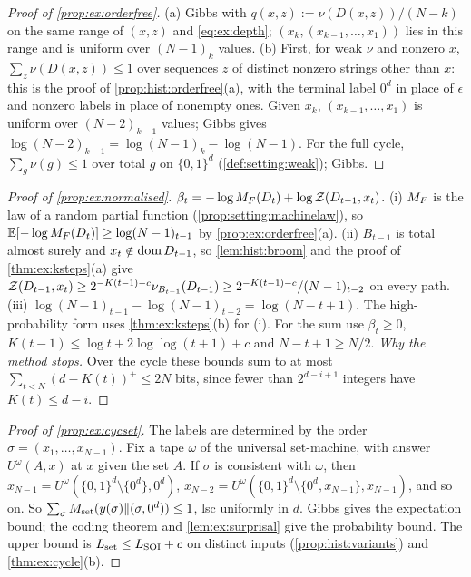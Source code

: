 \begin{proof}[Proof of \cref{prop:ex:orderfree}]
(a) Gibbs with $q(x,z):=\nu(D(x,z))/(N-k)$ on the same range of $(x,z)$ and \eqref{eq:ex:depth}; $(x_k,(x_{k-1},\dots,x_1))$ lies in this range and is uniform over $(N-1)_k$ values.
(b) First, for weak $\nu$ and nonzero $x$, $\sum_z\nu(D(x,z))\le1$ over sequences $z$ of distinct nonzero strings other than $x$: this is the proof of \cref{prop:hist:orderfree}(a), with the terminal label $0^d$ in place of $\epsilon$ and nonzero labels in place of nonempty ones. Given $x_k$, $(x_{k-1},\dots,x_1)$ is uniform over $(N-2)_{k-1}$ values; Gibbs gives $\log(N-2)_{k-1}=\log(N-1)_k-\log(N-1)$. For the full cycle, $\sum_g\nu(g)\le1$ over total $g$ on $\{0,1\}^d$ (\cref{def:setting:weak}); Gibbs.
\end{proof}

\begin{proof}[Proof of \cref{prop:ex:normalised}]
$\beta_t=-\log M_{F}(D_t)+\log\mathcal{Z}(D_{t-1},x_t)$. (i) $M_{F}$ is the law of a random partial function (\cref{prop:setting:machinelaw}), so $\mathbb{E}[-\log M_{F}(D_t)]\ge\log(N-1)_{t-1}$ by \cref{prop:ex:orderfree}(a). (ii) $B_{t-1}$ is total almost surely and $x_t\notin\operatorname{dom} D_{t-1}$, so \cref{lem:hist:broom} and the proof of \cref{thm:ex:ksteps}(a) give $\mathcal{Z}(D_{t-1},x_t)\ge2^{-K(t-1)-c}\nu_{B_{t-1}}(D_{t-1})\ge2^{-K(t-1)-c}/(N-1)_{t-2}$ on every path. (iii) $\log(N-1)_{t-1}-\log(N-1)_{t-2}=\log(N-t+1)$. The high-probability form uses \cref{thm:ex:ksteps}(b) for (i). For the sum use $\beta_t\ge0$, $K(t-1)\le\log t+2\log\log(t+1)+c$ and $N-t+1\ge N/2$.
\emph{Why the method stops.} Over the cycle these bounds sum to at most $\sum_{t<N}(d-K(t))^+\le2N$ bits, since fewer than $2^{d-i+1}$ integers have $K(t)\le d-i$.
\end{proof}

\begin{proof}[Proof of \cref{prop:ex:cycset}]
The labels are determined by the order $\sigma=(x_1,\dots,x_{N-1})$. Fix a tape $\omega$ of the universal set-machine, with answer $U^\omega(A,x)$ at $x$ given the set $A$. If $\sigma$ is consistent with $\omega$, then $x_{N-1}=U^\omega(\{0,1\}^d\setminus\{0^d\},0^d)$, $x_{N-2}=U^\omega(\{0,1\}^d\setminus\{0^d,x_{N-1}\},x_{N-1})$, and so on. So $\sum_\sigma M_{\mathrm{set}}(y(\sigma)\Vert(\sigma,0^d))\le1$, lsc uniformly in $d$. Gibbs gives the expectation bound; the coding theorem and \cref{lem:ex:surprisal} give the probability bound. The upper bound is $L_{\rm set}\le L_{\mathrm{SOI}}+c$ on distinct inputs (\cref{prop:hist:variants}) and \cref{thm:ex:cycle}(b).
\end{proof}

